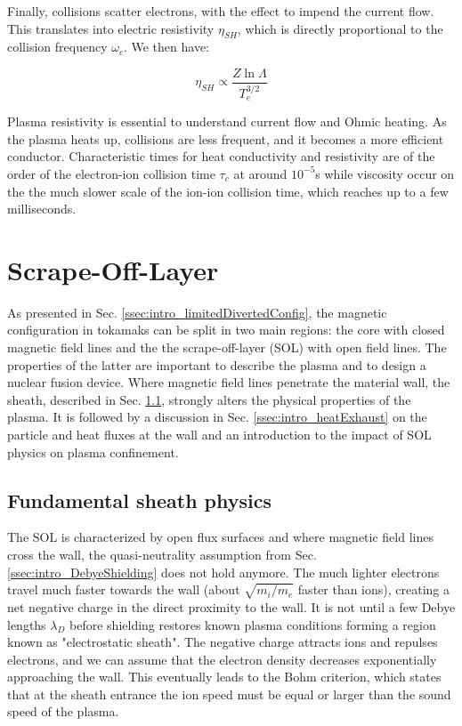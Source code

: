 Finally, collisions scatter electrons, with the effect to impend the current flow. This translates into electric resistivity $\eta_{SH}$, which is directly proportional to the collision frequency $\omega_c$. We then have:

\begin{equation}
	\eta_{SH}\propto\frac{Z \ln \Lambda}{T_e^{3/2}}
\end{equation}

Plasma resistivity is essential to understand current flow and Ohmic heating. As the plasma heats up, collisions are less frequent, and it becomes a more efficient conductor. Characteristic times for heat conductivity and resistivity are of the order of the electron-ion collision time $\tau_c$ at around $10^{-5}$s while viscosity occur on the the much slower scale of the ion-ion collision time, which reaches up to a few milliseconds. 



\section{Scrape-Off-Layer}
\label{sec:intro_SOL}

As presented in Sec. \ref{ssec:intro_limitedDivertedConfig}, the magnetic configuration in tokamaks can be split in two main regions: the core with closed magnetic field lines and the the scrape-off-layer (SOL) with open field lines. The properties of the latter are important to describe the plasma and to design a nuclear fusion device. Where magnetic field lines penetrate the material wall, the sheath, described in Sec. \ref{sec:intro_sheath}, strongly alters the physical properties of the plasma. It is followed by a discussion in Sec. \ref{ssec:intro_heatExhaust} on the particle and heat fluxes at the wall and an introduction to the impact of SOL physics on plasma confinement. 



\subsection{Fundamental sheath physics}
\label{sec:intro_sheath}

The SOL is characterized by open flux surfaces and where magnetic field lines cross the wall, the quasi-neutrality assumption from Sec. \ref{ssec:intro_DebyeShielding} does not hold anymore. The much lighter electrons travel much faster towards the wall (about $\sqrt{m_i/m_e}$ faster than ions), creating a net negative charge in the direct proximity to the wall. It is not until a few Debye lengths $\lambda_D$ before shielding restores known plasma conditions forming a region known as "electrostatic sheath". The negative charge attracts ions and repulses electrons, and we can assume that the electron density decreases exponentially approaching the wall. This eventually leads to the Bohm criterion\cite{riemann1991bohm}, which states that at the sheath entrance the ion speed must be equal or larger than the sound speed of the plasma.


